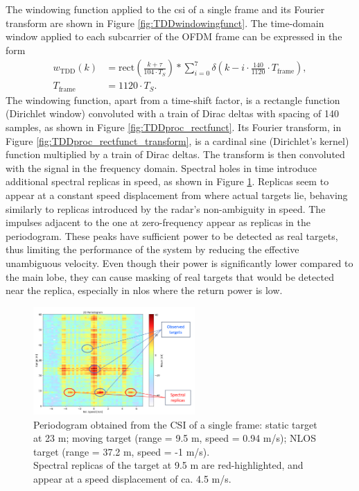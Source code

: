     The windowing function applied to the \gls{csi} of a single frame and its Fourier transform are shown in Figure \ref{fig:TDDwindowingfunct}.
    The time-domain window applied to each subcarrier of the OFDM frame can be expressed in the form
    \begin{align}
        w_{\text{TDD}}(k) &= \text{rect}\left( \frac{k + \tau}{104 \cdot T_S}\right) \ast \sum_{i=0}^7 \delta\left( k - i\cdot \frac{140}{1120}\cdot T_{\text{frame}} \right),  \\
        T_{\text{frame}} &= 1120 \cdot T_S.
    \end{align}
    The windowing function, apart from a time-shift factor, is a rectangle function (Dirichlet window) convoluted with a train of Dirac deltas with spacing of 140 samples, as shown in Figure \ref{fig:TDDproc_rectfunct}. Its Fourier transform, in Figure \ref{fig:TDDproc_rectfunct_transform}, is a cardinal sine (Dirichlet's kernel) function multiplied by a train of Dirac deltas.
    The transform is then convoluted with the signal in the frequency domain. 
    Spectral holes in time introduce additional spectral replicas in speed, as shown in Figure \ref{fig:SpectralReplicasDLULpattern}. Replicas seem to appear at a constant speed displacement from where actual targets lie, behaving similarly to replicas introduced by the radar's non-ambiguity in speed.
    The impulses adjacent to the one at zero-frequency appear as replicas in the periodogram. These peaks have sufficient power to be detected as real targets, thus limiting the performance of the system by reducing the effective unambiguous velocity. Even though their power is significantly lower compared to the main lobe, they can cause masking of real targets that would be detected near the replica, especially in \gls{nlos} where the return power is low. 
    \begin{figure}[b!]
    	\centering
    	\includegraphics[width=0.55\textwidth]{Images/TDDprocessing/SpectralReplicasDLULpattern.png}
    	\caption{\small Periodogram obtained from the CSI of a single frame: static target at 23 m; moving target (range = 9.5 m, speed = 0.94 m/s); NLOS target (range = 37.2 m, speed = -1 m/s).\\
    		Spectral replicas of the target at 9.5 m are red-highlighted, and appear at a speed displacement of ca. 4.5 m/s.}
    	\label{fig:SpectralReplicasDLULpattern}
    \end{figure}

